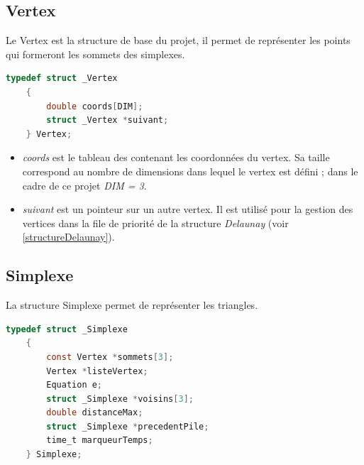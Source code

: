 \documentclass{article}
\begin{document}
    \subsection{Vertex}
    
        Le Vertex est la structure de base du projet, il permet de représenter les points qui formeront les sommets des simplexes.
    
    \begin{lstlisting}[caption={la structure Vertex},language=C,label=vertex]
    typedef struct _Vertex
    {
        double coords[DIM];	
        struct _Vertex *suivant;
    } Vertex;
	\end{lstlisting}
	
	\begin{itemize}
	\item \textit{coords} est le tableau des contenant les coordonnées du vertex. 
	Sa taille correspond au nombre de dimensions dans lequel le vertex est défini ; dans le cadre de ce projet \textit{DIM = 3}.
	\item \textit{suivant} est un pointeur sur un autre vertex. Il est utilisé pour la gestion des vertices dans la file de priorité de la structure \textit{Delaunay} (voir \ref{structureDelaunay}).
	\end{itemize}
	
    \subsection{Simplexe}
    
        La structure Simplexe permet de représenter les triangles.
     
    \begin{lstlisting}[caption={la structure Simplexe},language=C,label=simplexe]
    typedef struct _Simplexe
    {
    	const Vertex *sommets[3];
    	Vertex *listeVertex;
    	Equation e;
    	struct _Simplexe *voisins[3];
    	double distanceMax;
    	struct _Simplexe *precedentPile;
    	time_t marqueurTemps;
    } Simplexe;
	\end{lstlisting}
    
\end{document}

